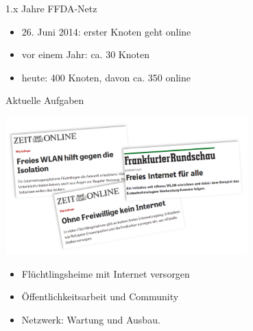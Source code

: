 \documentclass[10pt]{beamer}
\begin{document}
\begin{frame}{1.x Jahre FFDA-Netz}
	\vfill
	\begin{itemize}[<+->]
		\item 26. Juni 2014: erster Knoten geht online
		\item vor einem Jahr: ca. 30 Knoten
		\item heute: 400 Knoten, davon ca. 350 online
	\end{itemize}
	\begin{center}
	\end{center}
\end{frame}


\begin{frame}{Aktuelle Aufgaben}

	\begin{center}
		\includegraphics[width=0.7\textwidth]{images/2015-10_presse-fluechtlinge}
	\end{center}
	\begin{itemize}[<+->]
		\item \large Flüchtlingsheime mit Internet versorgen\\
		\item Öffentlichkeitsarbeit und Community
		\item Netzwerk: Wartung und Ausbau.
	\end{itemize}


\end{frame}
\end{document}
